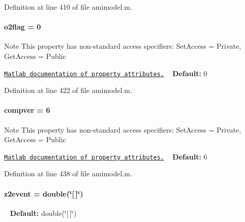 Definition at line 410 of file amimodel.\+m.

\hypertarget{classamimodel_a2b89e3b4e249878a2d436ee337952c4f}{}
\paragraph[{o2flag}]{\setlength{\rightskip}{0pt plus 5cm}o2flag = 0}\label{classamimodel_a2b89e3b4e249878a2d436ee337952c4f}
\begin{DoxyNote}{Note}
This property has non-\/standard access specifiers\+: {\ttfamily Set\+Access = Private, Get\+Access = Public} 

\href{http://www.mathworks.com/help/matlab/matlab_oop/property-attributes.html}{\tt Matlab documentation of property attributes.} ~\newline
{\bfseries Default\+:} 0 
\end{DoxyNote}


Definition at line 422 of file amimodel.\+m.

\hypertarget{classamimodel_a0a9e4caf628a02e6db68e91c2de6f382}{}
\paragraph[{compver}]{\setlength{\rightskip}{0pt plus 5cm}compver = 6}\label{classamimodel_a0a9e4caf628a02e6db68e91c2de6f382}
\begin{DoxyNote}{Note}
This property has non-\/standard access specifiers\+: {\ttfamily Set\+Access = Private, Get\+Access = Public} 

\href{http://www.mathworks.com/help/matlab/matlab_oop/property-attributes.html}{\tt Matlab documentation of property attributes.} ~\newline
{\bfseries Default\+:} 6 
\end{DoxyNote}


Definition at line 438 of file amimodel.\+m.

\hypertarget{classamimodel_a7a7be015feeb7a346dceccd49e622b4b}{}
\paragraph[{z2event}]{\setlength{\rightskip}{0pt plus 5cm}z2event = double(\char`\"{}\mbox{[}$\,$\mbox{]}\char`\"{})}\label{classamimodel_a7a7be015feeb7a346dceccd49e622b4b}
~\newline
{\bfseries Default\+:} double(\char`\"{}\mbox{[}$\,$\mbox{]}\char`\"{}) 

